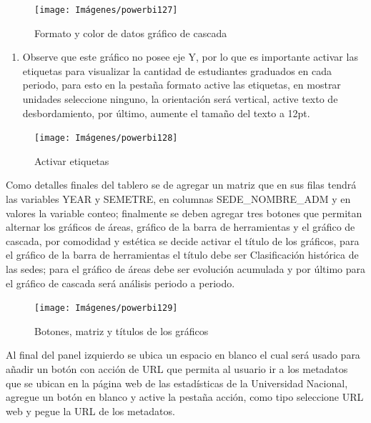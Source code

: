 \documentclass[
]{book}
\providecommand{\tightlist}{%
  \setlength{\itemsep}{0pt}\setlength{\parskip}{0pt}}
\begin{document}
\begin{figure}

{\centering \texttt{[image: Imágenes/powerbi127]} 

}

\caption{Formato y color de datos gráfico de cascada}\label{fig:paso4graficobarradeherramientas-fig}
\end{figure}

\begin{enumerate}
\def\labelenumi{\arabic{enumi}.}
\setcounter{enumi}{4}
\tightlist
\item
  Observe que este gráfico no posee eje Y, por lo que es importante activar las etiquetas para visualizar la cantidad de estudiantes graduados en cada periodo, para esto en la pestaña formato active las etiquetas, en mostrar unidades seleccione ninguno, la orientación será vertical, active texto de desbordamiento, por último, aumente el tamaño del texto a 12pt.
\end{enumerate}

\begin{figure}

{\centering \texttt{[image: Imágenes/powerbi128]} 

}

\caption{Activar etiquetas}\label{fig:paso5graficobarradeherramientas-fig}
\end{figure}

Como detalles finales del tablero se de agregar un matriz que en sus filas tendrá las variables YEAR y SEMETRE, en columnas SEDE\_NOMBRE\_ADM y en valores la variable conteo; finalmente se deben agregar tres botones que permitan alternar los gráficos de áreas, gráfico de la barra de herramientas y el gráfico de cascada, por comodidad y estética se decide activar el título de los gráficos, para el gráfico de la barra de herramientas el título debe ser Clasificación histórica de las sedes; para el gráfico de áreas debe ser evolución acumulada y por último para el gráfico de cascada será análisis periodo a periodo.

\begin{figure}

{\centering \texttt{[image: Imágenes/powerbi129]} 

}

\caption{Botones, matriz y títulos de los gráficos}\label{fig:detallesgraficobarradeherramientas-fig}
\end{figure}

Al final del panel izquierdo se ubica un espacio en blanco el cual será usado para añadir un botón con acción de URL que permita al usuario ir a los metadatos que se ubican en la página web de las estadísticas de la Universidad Nacional, agregue un botón en blanco y active la pestaña acción, como tipo seleccione URL web y pegue la URL de los metadatos.
\end{document}
